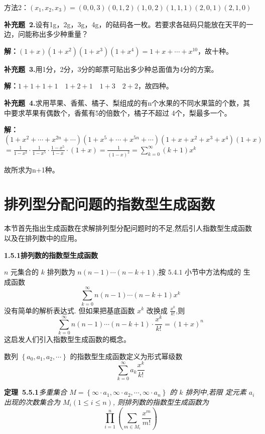 \documentclass{report}
\begin{document}
方法2：$\left(x_{1}, x_{2}, x_{3}\right)=(0,0,3)(0, 1, 2)(1,0,2)(1,1,1)(2,0,1)(2,1,0)$

\textbf{补充题\ 2.}设有1g，2g，3g，4g，的砝码各一枚。若要求各砝码只能放在天平的一边，问能称出多少种重量？

\textbf{解：}$(1+x)\left(1+x^{2}\right)\left(1+x^{3}\right)\left(1+x^{4}\right)=1+x+\cdots+x^{10}$，故十种。

\textbf{补充题\ 3.}用1分，2分，3分的邮票可贴出多少种总面值为4分的方案。

\textbf{解：}$1+1+1+1 \quad 1+2+1 \quad 1+3 \quad 2+2$，故四种。


\textbf{补充题\ 4.}求用苹果、香蕉、橘子、梨组成的有n个水果的不同水果篮的个数，其中要求苹果有偶数个，香蕉有5的倍数个，橘子不超过
4个，梨最多一个。

\textbf{解：}$\left(1+x^{2}+\cdots+x^{2 n}+\cdots\right)\left(1+x^{5}+\cdots+x^{5 n}+\cdots\right)\left(1+x+x^{2}+x^{3}+x^{4}\right)(1+x)$
$=\frac{1}{1-x^{2}} \cdot \frac{1}{1-x^{5}} \cdot \frac{1-x^{5}}{1-x} \cdot(1+x)=\frac{1}{(1-x)^{2}}=\sum_{k=0}^{\infty}(k+1) x^{k}$

故所求为n+1种。


\section{排列型分配问题的指数型生成函数}
本节首先指出生成函数在求解排列型分配问题时的不足,然后引人指数型生成函数以及在排列数中的应用。

\textbf{1.5.1排列数的指数型生成函数}

$n$ 元集合的 $k$ 排列数为 $n(n-1) \cdots(n-k+1)$,按 $5.4 .1$ 小节中方法构成的 生成函数
$$
\sum_{k=0}^{\infty} n(n-1) \cdots(n-k+1) x^{k}
$$
没有简单的解析表达式. 但如果把基底函数 $x^{k}$ 改换成 $\frac{x^{k}}{k !}$,则
$$
\sum_{k=0}^{\infty} n(n-1) \cdots(n-k+1) \cdot \frac{x^{k}}{k !}=(1+x)^{n}
$$
这启发人们引入指数型生成函数的概念。

数列 $\left\{a_{0}, a_{1}, a_{2}, \cdots\right\}$ 的指数型生成函数定义为形式幂级数
$$
\sum_{k=0}^{\infty} a_{k} \frac{x^{k}}{k !}
$$

\noindent
\textbf{定理\ 5.5.1}\textsl{多重集合 $M=\left\{\infty \cdot a_{1}, \infty \cdot a_{2}, \cdots, \infty \cdot a_{n}\right\}$ 的 $k$ 排列中,若限 定元素 $a_{i}$ 出现的次数集合为 $M_{i}(1 \leqslant i \leqslant n)$, 则排列数的指数型生成函数为
$$
\prod_{i=1}^{n}\left(\sum_{m \in M_{i}} \frac{x^{m}}{m !}\right)
$$}
\end{document}
